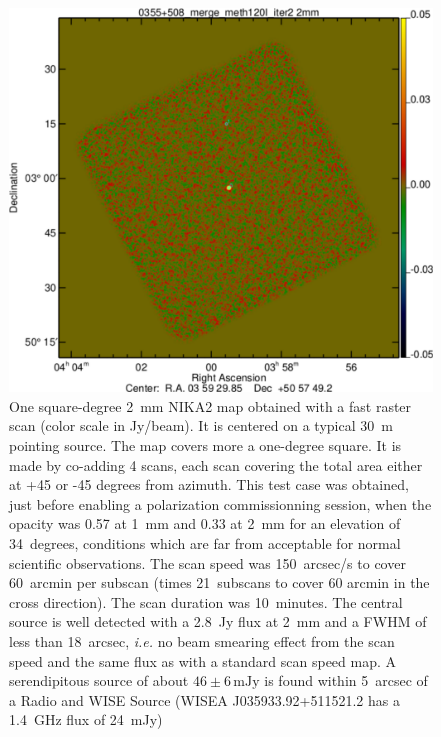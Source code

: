 \documentclass[10pt,a4paper,twoside,graphicx,color]{article}
\begin{document}
\begin{figure}
  \begin{center}
   \includegraphics[width=0.3\columnwidth]{./Figures/0355+508_merge_meth120I_iter2_source_detect2mmCrop.pdf}
  \end{center}
\caption{One square-degree 2~mm NIKA2 map obtained with a fast raster scan
  (color scale in Jy/beam). It is centered on a typical 30~m pointing
  source.  The map covers more a one-degree square. It is made by
  co-adding 4 scans, each scan covering the total area either at +45
  or -45 degrees from azimuth. This test case was obtained, just
  before enabling a polarization commissionning session, when the
  opacity was 0.57 at 1~mm and 0.33 at 2~mm for an elevation of
  34~degrees, conditions which are far from acceptable for normal
  scientific observations. The scan speed was 150~arcsec/s to cover
  60~arcmin per subscan (times 21~subscans to cover 60 arcmin in the
  cross direction). The scan duration was 10~minutes. The central
  source is well detected with a 2.8~Jy flux at 2~mm and a FWHM of
  less than 18~arcsec, {\sl i.e.} no beam smearing effect from the
  scan speed and the same flux as with a standard scan speed map. A
  serendipitous source of about $46\pm6\,\mathrm{mJy}$ is found within
  5~arcsec of a Radio and WISE Source (WISEA J035933.92+511521.2 has a
  1.4~GHz flux of 24~mJy)}
\label{Fig:1sqdegMap}

\end{figure}



\end{document}
